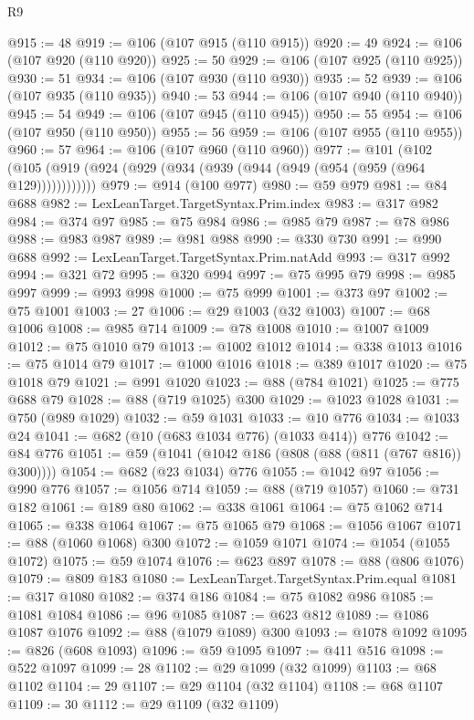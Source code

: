 \begin{lexlean}{R9}
\begin{coremodule}
@915 := 48
@919 := @106 (@107 @915 (@110 @915))
@920 := 49
@924 := @106 (@107 @920 (@110 @920))
@925 := 50
@929 := @106 (@107 @925 (@110 @925))
@930 := 51
@934 := @106 (@107 @930 (@110 @930))
@935 := 52
@939 := @106 (@107 @935 (@110 @935))
@940 := 53
@944 := @106 (@107 @940 (@110 @940))
@945 := 54
@949 := @106 (@107 @945 (@110 @945))
@950 := 55
@954 := @106 (@107 @950 (@110 @950))
@955 := 56
@959 := @106 (@107 @955 (@110 @955))
@960 := 57
@964 := @106 (@107 @960 (@110 @960))
@977 := @101
    (@102 (@105 (@919 (@924 (@929 (@934 (@939 (@944 (@949 (@954 (@959 (@964 @129))))))))))))
@979 := @914 (@100 @977)
@980 := @59 @979
@981 := @84 @688
@982 := LexLeanTarget.TargetSyntax.Prim.index
@983 := @317 @982
@984 := @374 @97
@985 := @75 @984
@986 := @985 @79
@987 := @78 @986
@988 := @983 @987
@989 := @981 @988
@990 := @330 @730
@991 := @990 @688
@992 := LexLeanTarget.TargetSyntax.Prim.natAdd
@993 := @317 @992
@994 := @321 @72
@995 := @320 @994
@997 := @75 @995 @79
@998 := @985 @997
@999 := @993 @998
@1000 := @75 @999
@1001 := @373 @97
@1002 := @75 @1001
@1003 := 27
@1006 := @29 @1003 (@32 @1003)
@1007 := @68 @1006
@1008 := @985 @714
@1009 := @78 @1008
@1010 := @1007 @1009
@1012 := @75 @1010 @79
@1013 := @1002 @1012
@1014 := @338 @1013
@1016 := @75 @1014 @79
@1017 := @1000 @1016
@1018 := @389 @1017
@1020 := @75 @1018 @79
@1021 := @991 @1020
@1023 := @88 (@784 @1021)
@1025 := @775 @688 @79
@1028 := @88 (@719 @1025) @300
@1029 := @1023 @1028
@1031 := @750 (@989 @1029)
@1032 := @59 @1031
@1033 := @10 @776
@1034 := @1033 @24
@1041 := @682 (@10 (@683 @1034 @776) (@1033 @414)) @776
@1042 := @84 @776
@1051 := @59 (@1041 (@1042 @186 (@808 (@88 (@811 (@767 @816)) @300))))
@1054 := @682 (@23 @1034) @776
@1055 := @1042 @97
@1056 := @990 @776
@1057 := @1056 @714
@1059 := @88 (@719 @1057)
@1060 := @731 @182
@1061 := @189 @80
@1062 := @338 @1061
@1064 := @75 @1062 @714
@1065 := @338 @1064
@1067 := @75 @1065 @79
@1068 := @1056 @1067
@1071 := @88 (@1060 @1068) @300
@1072 := @1059 @1071
@1074 := @1054 (@1055 @1072)
@1075 := @59 @1074
@1076 := @623 @897
@1078 := @88 (@806 @1076)
@1079 := @809 @183
@1080 := LexLeanTarget.TargetSyntax.Prim.equal
@1081 := @317 @1080
@1082 := @374 @186
@1084 := @75 @1082 @986
@1085 := @1081 @1084
@1086 := @96 @1085
@1087 := @623 @812
@1089 := @1086 @1087 @1076
@1092 := @88 (@1079 @1089) @300
@1093 := @1078 @1092
@1095 := @826 (@608 @1093)
@1096 := @59 @1095
@1097 := @411 @516
@1098 := @522 @1097
@1099 := 28
@1102 := @29 @1099 (@32 @1099)
@1103 := @68 @1102
@1104 := 29
@1107 := @29 @1104 (@32 @1104)
@1108 := @68 @1107
@1109 := 30
@1112 := @29 @1109 (@32 @1109)

\end{coremodule}
\end{lexlean}

